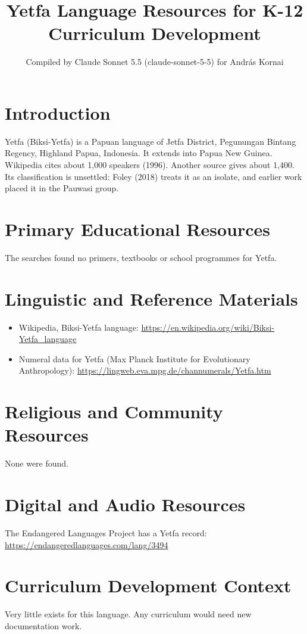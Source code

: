 \documentclass[12pt]{article}
\title{Yetfa Language Resources for K-12 Curriculum Development}
\author{Compiled by Claude Sonnet 5.5 (claude-sonnet-5-5) for Andr\'as Kornai}
\date{}
\begin{document}
\maketitle

\section{Introduction}
Yetfa (Biksi-Yetfa) is a Papuan language of Jetfa District, Pegunungan Bintang Regency, Highland Papua, Indonesia. It extends into Papua New Guinea. Wikipedia cites about 1,000 speakers (1996). Another source gives about 1,400. Its classification is unsettled: Foley (2018) treats it as an isolate, and earlier work placed it in the Pauwasi group.

\section{Primary Educational Resources}
The searches found no primers, textbooks or school programmes for Yetfa.

\section{Linguistic and Reference Materials}
\begin{itemize}
\item Wikipedia, Biksi-Yetfa language: \url{https://en.wikipedia.org/wiki/Biksi-Yetfa_language}
\item Numeral data for Yetfa (Max Planck Institute for Evolutionary Anthropology): \url{https://lingweb.eva.mpg.de/channumerals/Yetfa.htm}
\end{itemize}

\section{Religious and Community Resources}
None were found.

\section{Digital and Audio Resources}
The Endangered Languages Project has a Yetfa record: \url{https://endangeredlanguages.com/lang/3494}

\section{Curriculum Development Context}
Very little exists for this language. Any curriculum would need new documentation work.
\end{document}
